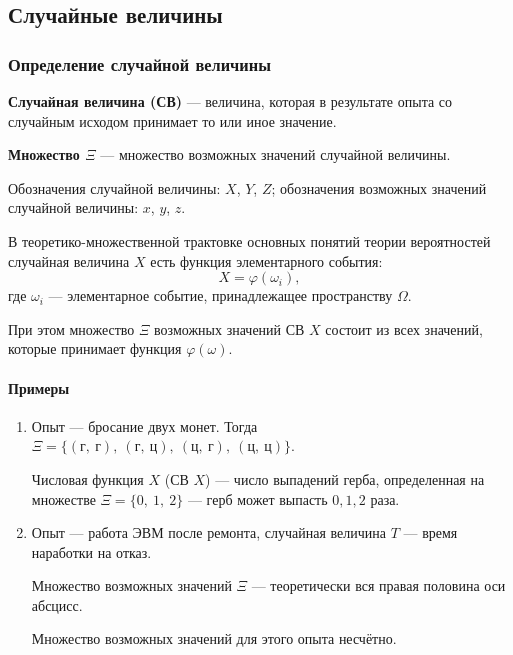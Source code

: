 \documentclass[a4paper]{article}
\newcommand{\key}[1]{{\bfseries\color{Medium} #1}}
\begin{document}
        \subsection{Случайные величины}

            \subsubsection{Определение случайной величины}

                \key{Случайная величина (СВ)} --- величина, которая в результате опыта со случайным исходом принимает то или иное значение.
                
                \key{Множество \boldmath$\Xi$} --- множество возможных значений случайной величины.
                
                Обозначения случайной величины: $X$, $Y$, $Z$; \newline
                обозначения возможных значений случайной величины: $x$, $y$, $z$.

                В теоретико-множественной трактовке основных понятий теории вероятностей случайная величина $X$ есть функция элементарного события:
                \begin{equation*}
                    X = \varphi (\omega_i) ,
                \end{equation*}
                где $\omega_i$ --- элементарное событие, принадлежащее пространству $\Omega$.
                
                При этом множество $\Xi$ возможных значений СВ $X$ состоит из всех значений, которые принимает функция $\varphi (\omega)$.

                \paragraph{Примеры}

                    \begin{enumerate}
                        \item Опыт --- бросание двух монет. Тогда $\Xi = \{ (\text{г}, \: \text{г}) , \: (\text{г}, \: \text{ц}) , \: (\text{ц}, \: \text{г}) , \: (\text{ц}, \: \text{ц}) \}$.
                        
                        Числовая функция $X$ (СВ $X$) --- число выпадений герба, определенная на множестве $\Xi = \{ 0, \: 1, \: 2 \}$ --- герб может выпасть $0, 1, 2$ раза.

                        \item Опыт --- работа ЭВМ после ремонта, случайная величина $T$ --- время наработки на отказ.
                        
                        Множество возможных значений $\Xi$ --- теоретически вся правая половина оси абсцисс.
                        
                        Множество возможных значений для этого опыта несчётно.
                    \end{enumerate}
\end{document}
